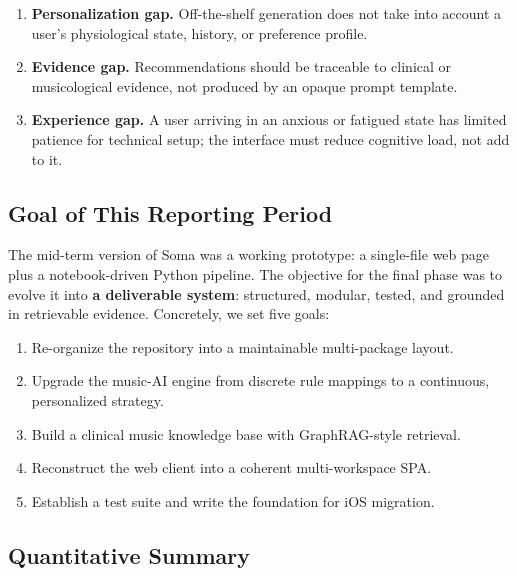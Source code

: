 \documentclass[11pt,a4paper]{article}
\begin{document}
\begin{enumerate}[leftmargin=*]
  \item \textbf{Personalization gap.} Off-the-shelf generation does not take
    into account a user's physiological state, history, or preference profile.
  \item \textbf{Evidence gap.} Recommendations should be traceable to clinical
    or musicological evidence, not produced by an opaque prompt template.
  \item \textbf{Experience gap.} A user arriving in an anxious or fatigued
    state has limited patience for technical setup; the interface must reduce
    cognitive load, not add to it.
\end{enumerate}

\subsection{Goal of This Reporting Period}

The mid-term version of Soma was a working prototype: a single-file web page
plus a notebook-driven Python pipeline. The objective for the final phase was
to evolve it into \textbf{a deliverable system}: structured, modular, tested,
and grounded in retrievable evidence. Concretely, we set five goals:

\begin{enumerate}[leftmargin=*]
  \item Re-organize the repository into a maintainable multi-package layout.
  \item Upgrade the music-AI engine from discrete rule mappings to a
    continuous, personalized strategy.
  \item Build a clinical music knowledge base with GraphRAG-style retrieval.
  \item Reconstruct the web client into a coherent multi-workspace SPA.
  \item Establish a test suite and write the foundation for iOS migration.
\end{enumerate}

\subsection{Quantitative Summary}
\end{document}
